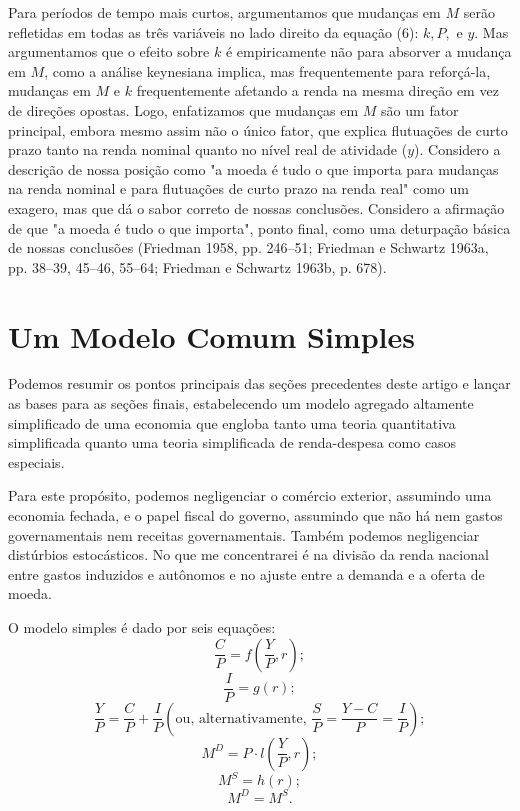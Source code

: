 \documentclass[12pt]{article}
\begin{document}
Para períodos de tempo mais curtos, argumentamos que mudanças em $M$ serão refletidas em todas as três variáveis no lado direito da equação (6): $k, P,$ e $y$. Mas argumentamos que o efeito sobre $k$ é empiricamente não para absorver a mudança em $M$, como a análise keynesiana implica, mas frequentemente para reforçá-la, mudanças em $M$ e $k$ frequentemente afetando a renda na mesma direção em vez de direções opostas. Logo, enfatizamos que mudanças em $M$ são um fator principal, embora mesmo assim não o único fator, que explica flutuações de curto prazo tanto na renda nominal quanto no nível real de atividade ($y$). Considero a descrição de nossa posição como "a moeda é tudo o que importa para mudanças na renda nominal e para flutuações de curto prazo na renda real" como um exagero, mas que dá o sabor correto de nossas conclusões. Considero a afirmação de que "a moeda é tudo o que importa", ponto final, como uma deturpação básica de nossas conclusões (Friedman 1958, pp. 246–51; Friedman e Schwartz 1963a, pp. 38–39, 45–46, 55–64; Friedman e Schwartz 1963b, p. 678).

\section{Um Modelo Comum Simples}

Podemos resumir os pontos principais das seções precedentes deste artigo e lançar as bases para as seções finais, estabelecendo um modelo agregado altamente simplificado de uma economia que engloba tanto uma teoria quantitativa simplificada quanto uma teoria simplificada de renda-despesa como casos especiais.

Para este propósito, podemos negligenciar o comércio exterior, assumindo uma economia fechada, e o papel fiscal do governo, assumindo que não há nem gastos governamentais nem receitas governamentais. Também podemos negligenciar distúrbios estocásticos. No que me concentrarei é na divisão da renda nacional entre gastos induzidos e autônomos e no ajuste entre a demanda e a oferta de moeda.

O modelo simples é dado por seis equações:
\begin{equation}
\frac{C}{P} = f\left(\frac{Y}{P}, r\right);
\end{equation}
\begin{equation}
\frac{I}{P} = g(r);
\end{equation}
\begin{equation}
\frac{Y}{P} = \frac{C}{P} + \frac{I}{P} \left(\text{ou, alternativamente, } \frac{S}{P} = \frac{Y - C}{P} = \frac{I}{P}\right);
\end{equation}
\begin{equation}
M^D = P \cdot l\left(\frac{Y}{P}, r\right);
\end{equation}
\begin{equation}
M^S = h(r);
\end{equation}
\begin{equation}
M^D = M^S.
\end{equation}
\end{document}
